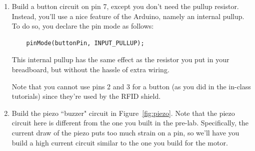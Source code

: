 \documentclass[11pt]{article} %
\begin{document}
\begin{enumerate}
\begin{enumerate}
    \vspace{0.25in}
    Resistance (LED on): \rule{2in}{0.4pt}

    \vspace{0.25in}
    Resistance (LED off): \rule{2in}{0.4pt}
    \vspace{0.25in}

    \item Choose a fixed resistor, $R$, with a value that is near the \emph{geometric mean}\footnote{It can be shown that doing so will give the largest voltage swing in your circuit, which makes it as sensitive as possible.} of the two values you measured above and complete the circuit.
    \item Use the example program \verb|AnalogReadSerial| (or write your own) to read the ADC at the junction and print it to the Serial Monitor every 500 ms. Run some tests to determine the ADC reading with the LED on and with it off. Choose a threshold that will serve to indicate that the beam is blocked -- that there is an intruder! Record your values below. How did you decide on a threshold value?

    \vspace{0.25in}
    ADC reading (LED on): \rule{2in}{0.4pt}

    \vspace{0.25in}
    ADC reading (LED off): \rule{2in}{0.4pt}

    \vspace{0.25in}
    Threshold ADC value: \rule{2in}{0.4pt}
    \vspace{0.25in}

\end{enumerate}
\item Build a button circuit on pin 7, except you don't need the pullup resistor. Instead, you'll use a nice feature of the Arduino, namely an internal pullup. To do so, you declare the pin mode as follows:

\begin{verbatim}
    pinMode(buttonPin, INPUT_PULLUP);
\end{verbatim}

This internal pullup has the same effect as the resistor you put in your breadboard, but without the hassle of extra wiring.

Note that you cannot use pins 2 and 3 for a button (as you did in the in-class tutorials) since they're used by the RFID shield.
\item Build the piezo ``buzzer" circuit in Figure~\ref{fig:piezo}. Note that the piezo circuit here is different from the one you built in the pre-lab. Specifically, the current draw of the piezo puts too much strain on a pin, so we'll have you build a high current circuit similar to the one you build for the motor.


\end{enumerate}
\end{document}
